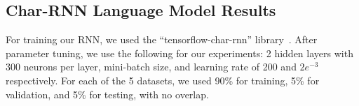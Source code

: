 \subsection{Char-RNN Language Model Results}
For training our RNN, we used the ``tensorflow-char-rnn'' library~\cite{45381}. After parameter tuning, we use the following for our experiments: 2 hidden layers with 300 neurons per layer, mini-batch size, and learning rate of 200 and $2 e^{-3}$ respectively.
For each of the 5 datasets, we used 90\% for training, 5\% for validation, and 5\% for testing, with no overlap.

